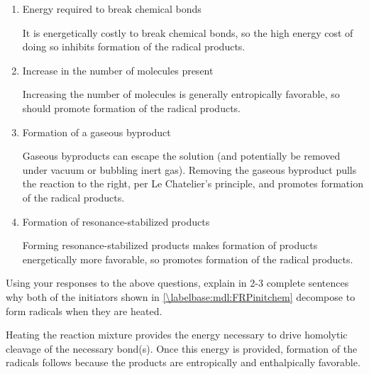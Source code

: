 \begin{activity}
\begin{exercises}
		\begin{enumerate}
			\item Energy required to break chemical bonds
	
				\begin{solution}
					It is energetically costly to break chemical bonds, so the high energy cost of doing so inhibits formation of the radical products.
				\end{solution}
			
			\item Increase in the number of molecules present
	
				\begin{solution}
					Increasing the number of molecules is generally entropically favorable, so should promote formation of the radical products.
				\end{solution}
			
			\item Formation of a gaseous byproduct
	
				\begin{solution}
					Gaseous byproducts can escape the solution (and potentially be removed under vacuum or bubbling inert gas).  Removing the gaseous byproduct pulls the reaction to the right, per Le Chatelier's principle, and promotes formation of the radical products.
				\end{solution}
			
			\item Formation of resonance-stabilized products
	
				\begin{solution}
					Forming resonance-stabilized products makes formation of products energetically more favorable, so promotes formation of the radical products.
				\end{solution}
		\end{enumerate}
		
		Using your responses to the above questions, explain in 2-3 complete sentences why both of the initiators shown in \ref{\labelbase:mdl:FRPinitchem} decompose to form radicals when they are heated.
		
	
				\begin{solution}
					Heating the reaction mixture provides the energy necessary to drive homolytic cleavage of the necessary bond(s).  Once this energy is provided, formation of the radicals follows because the products are entropically and enthalpically favorable.
				\end{solution}


\end{exercises}
\end{activity}
